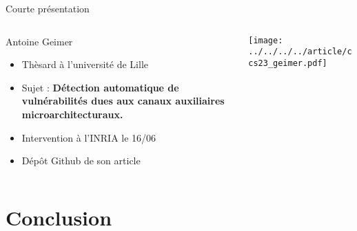 \documentclass[A4,svgnames,9pt,aspectratio=169]{beamer}
\begin{document}
\begin{frame}{Courte présentation}
  \begin{columns}
    \begin{column}{0.6\textwidth}
      \begin{block}{Antoine Geimer}
        \begin{itemize}
          \item Thèsard à l'université de Lille
          \item Sujet : \textbf{Détection automatique de vulnérabilités dues aux canaux auxiliaires microarchitecturaux.}
          \item Intervention à l'INRIA le 16/06
          \item Dépôt Github de son article
        \end{itemize}
      \end{block}
    \end{column}
    \begin{column}{0.4\textwidth}
      \begin{center}
        \newlength{\imagewidth}
        \texttt{[image: ../../../../article/ccs23\_geimer.pdf]}
      \end{center}
    \end{column}
  \end{columns}
\end{frame}





\section{Conclusion}
\frame{\sectionpage}
\end{document}
